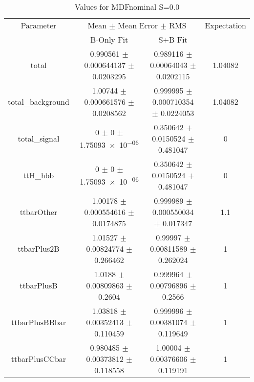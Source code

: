 \begin{table}
\centering
\caption{Values for MDFnominal S=0.0}
\begin{tabular}{cccc}
\toprule
Parameter & \multicolumn{2}{c}{Mean $\pm$ Mean Error $\pm$ RMS} & Expectation\\
 & B-Only Fit & S+B Fit & \\
\midrule
total & \num{0.990561} $\pm$ \num{0.000644137} $\pm$ \num{0.0203295} & \num{0.989116} $\pm$ \num{0.00064043} $\pm$ \num{0.0202115} & \num{1.04082}\\
total\_background & \num{1.00744} $\pm$ \num{0.000661576} $\pm$ \num{0.0208562} & \num{0.999995} $\pm$ \num{0.000710354} $\pm$ \num{0.0224053} & \num{1.04082}\\
total\_signal & \num{0} $\pm$ \num{0} $\pm$ \num{1.75093e-06} & \num{0.350642} $\pm$ \num{0.0150524} $\pm$ \num{0.481047} & \num{0}\\
ttH\_hbb & \num{0} $\pm$ \num{0} $\pm$ \num{1.75093e-06} & \num{0.350642} $\pm$ \num{0.0150524} $\pm$ \num{0.481047} & \num{0}\\
ttbarOther & \num{1.00178} $\pm$ \num{0.000554616} $\pm$ \num{0.0174875} & \num{0.999989} $\pm$ \num{0.000550034} $\pm$ \num{0.017347} & \num{1.1}\\
ttbarPlus2B & \num{1.01527} $\pm$ \num{0.00824774} $\pm$ \num{0.266462} & \num{0.99997} $\pm$ \num{0.00811589} $\pm$ \num{0.262024} & \num{1}\\
ttbarPlusB & \num{1.0188} $\pm$ \num{0.00809863} $\pm$ \num{0.2604} & \num{0.999964} $\pm$ \num{0.00796896} $\pm$ \num{0.2566} & \num{1}\\
ttbarPlusBBbar & \num{1.03818} $\pm$ \num{0.00352413} $\pm$ \num{0.110459} & \num{0.999996} $\pm$ \num{0.00381074} $\pm$ \num{0.119649} & \num{1}\\
ttbarPlusCCbar & \num{0.980485} $\pm$ \num{0.00373812} $\pm$ \num{0.118558} & \num{1.00004} $\pm$ \num{0.00376606} $\pm$ \num{0.119191} & \num{1}\\
\bottomrule
\end{tabular}
\end{table}
